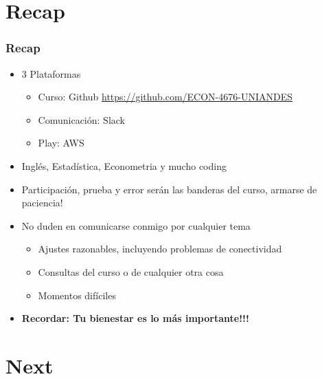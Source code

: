 \documentclass[
  shownotes,
  xcolor={svgnames},
  hyperref={colorlinks,citecolor=DarkBlue,linkcolor=DarkRed,urlcolor=DarkBlue}
  ]{beamer}
\begin{document}

\section{Recap}
\begin{frame}
\frametitle{Recap}

\begin{itemize} 
  \item 3 Plataformas
    \begin{itemize} 
      \item Curso: Github \url{https://github.com/ECON-4676-UNIANDES}
      \item Comunicación: Slack
      \item Play: AWS
    \end{itemize}
    \medskip
    \item Inglés, Estadística, Econometria y mucho coding
    \medskip
    \item Participación, prueba y error serán las banderas del curso, armarse de paciencia!
    \medskip
    \item No duden en comunicarse conmigo por cualquier tema
    \begin{itemize} 
      \item Ajustes razonables, incluyendo problemas de conectividad
      \item Consultas del curso o de cualquier otra cosa
      \item Momentos difíciles 
    \end{itemize}
    \bigskip
    \item {\bf Recordar: Tu bienestar es lo más importante!!!}
\end{itemize}
\end{frame}




\section{Next}
\end{document}

